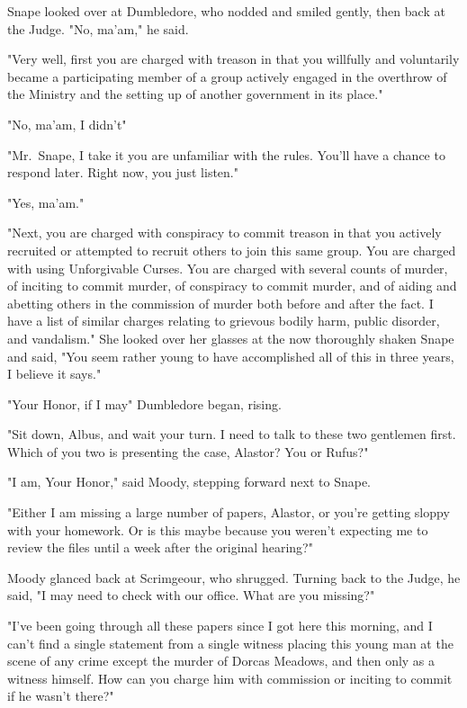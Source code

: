 Snape looked over at Dumbledore, who nodded and smiled gently, then back at the Judge. "No, ma'am," he said.

"Very well, first you are charged with treason in that you willfully and voluntarily became a participating member of a group actively engaged in the overthrow of the Ministry and the setting up of another government in its place."

"No, ma'am, I didn't{\el}"

"Mr.~Snape, I take it you are unfamiliar with the rules. You'll have a chance to respond later. Right now, you just listen."

"Yes, ma'am."

"Next, you are charged with conspiracy to commit treason in that you actively recruited or attempted to recruit others to join this same group. You are charged with using Unforgivable Curses. You are charged with several counts of murder, of inciting to commit murder, of conspiracy to commit murder, and of aiding and abetting others in the commission of murder both before and after the fact. I have a list of similar charges relating to grievous bodily harm, public disorder, and vandalism." She looked over her glasses at the now thoroughly shaken Snape and said, "You seem rather young to have accomplished all of this in{\el} three years, I believe it says."

"Your Honor, if I may{\el}" Dumbledore began, rising.

"Sit down, Albus, and wait your turn. I need to talk to these two gentlemen first. Which of you two is presenting the case, Alastor? You or Rufus?"

"I am, Your Honor," said Moody, stepping forward next to Snape.

"Either I am missing a large number of papers, Alastor, or you're getting sloppy with your homework. Or is this maybe because you weren't expecting me to review the files until a week after the original hearing?"

Moody glanced back at Scrimgeour, who shrugged. Turning back to the Judge, he said, "I may need to check with our office. What are you missing?"

"I've been going through all these papers since I got here this morning, and I can't find a single statement from a single witness placing this young man at the scene of any crime except the murder of Dorcas Meadows, and then only as a witness himself. How can you charge him with commission or inciting to commit if he wasn't there?"

